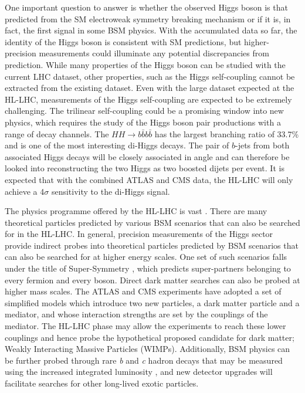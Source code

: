 One important question to answer is whether the observed Higgs boson is that predicted from the SM electroweak symmetry breaking mechanism \cite{ewsb} or if it is, in fact, the first signal in some BSM physics. With the accumulated data so far, the identity of the Higgs boson is consistent with SM predictions, but higher-precision measurements could illuminate any potential discrepancies from prediction. While many properties of the Higgs boson can be studied with the current LHC dataset, other properties, such as the Higgs self-coupling cannot be extracted from the existing dataset. Even with the large dataset expected at the HL-LHC, measurements of the Higgs self-coupling are expected to be extremely challenging. The trilinear self-coupling could be a promising window into new physics, which requires the study of the Higgs boson pair productions with a range of decay channels. The $HH \rightarrow b\bar{b}b\bar{b}$ has the largest branching ratio of 33.7\% and is one of the most interesting di-Higgs decays. The pair of $b$-jets from both associated Higgs decays will be closely associated in angle and can therefore be looked into reconstructing the two Higgs as two boosted dijets per event. It is expected that with the combined ATLAS and CMS data, the HL-LHC will only achieve a 4$\sigma$ sensitivity to the di-Higgs signal.


The physics programme offered by the HL-LHC is vast \cite{big-report}. There are many theoretical particles predicted by various BSM scenarios that can also be searched for in the HL-LHC. In general, precision measurements of the Higgs sector provide indirect probes into theoretical particles predicted by BSM scenarios that can also be searched for at higher energy scales. One set of such scenarios falls under the title of Super-Symmetry \cite{supersym}, which predicts super-partners belonging to every fermion and every boson. Direct dark matter searches can also be probed at higher mass scales. The ATLAS and CMS experiments have adopted a set of simplified models which introduce two new particles, a dark matter particle and a mediator, and whose interaction strengths are set by the couplings of the mediator. The HL-LHC phase may allow the experiments to reach these lower couplings and hence probe the hypothetical proposed candidate for dark matter; Weakly Interacting Massive Particles (WIMPs). Additionally, BSM physics can be further probed through rare \textit{b} and \textit{c} hadron decays that may be measured using the increased integrated luminosity \cite{wg-bsm}, and new detector upgrades will facilitate searches for other long-lived exotic particles.


